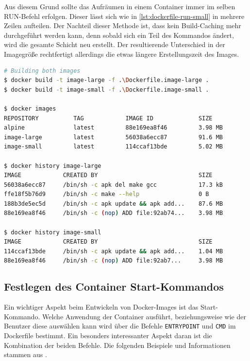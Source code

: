 Aus diesem Grund sollte das Aufräumen in einem Container immer im selben RUN-Befehl erfolgen.
Dieser lässt sich wie in \cref{lst:dockerfile-run-small} in mehrere Zeilen aufteilen.
Der Nachteil dieser Methode ist, dass kein Build-Caching mehr durchgeführt werden kann, denn sobald sich ein Teil des Kommandos ändert, wird die gesamte Schicht neu erstellt.
Der resultierende Unterschied in der Imagegröße rechtfertigt allerdings die etwas längere Erstellungszeit des Images.



\begin{lstlisting}[caption=Vergleich der Imagegröße nach Optimierung des RUN-Befehls, language=bash, label=lst:dockerfile-run-imagesize]
# Building both images
$ docker build -t image-large -f .\Dockerfile.image-large .
$ docker build -t image-small -f .\Dockerfile.image-small .

$ docker images
REPOSITORY          TAG            IMAGE ID             SIZE
alpine              latest         88e169ea8f46         3.98 MB
image-large         latest         56038a6ecc87         91.6 MB
image-small         latest         114ccaf13bde         5.02 MB

$ docker history image-large
IMAGE            CREATED BY                             SIZE
56038a6ecc87     /bin/sh -c apk del make gcc            17.3 kB
ffe18f5b76d9     /bin/sh -c make --help                 0 B
188b3de5ec5d     /bin/sh -c apk update && apk add...    87.6 MB
88e169ea8f46     /bin/sh -c (nop) ADD file:92ab74...    3.98 MB

$ docker history image-small
IMAGE            CREATED BY                             SIZE
114ccaf13bde     /bin/sh -c apk update && apk add...    1.04 MB
88e169ea8f46     /bin/sh -c (nop) ADD file:92ab7...     3.98 MB
\end{lstlisting}

\subsection{Festlegen des Container Start-Kommandos}
\label{sec:container-startup-command}
Ein wichtiger Aspekt beim Entwickeln von Docker-Images ist das Start-Kommando.
Welche Anwendung der Container ausführt, beziehungsweise wie der Benutzer diese auswählen kann wird über die Befehle \texttt{ENTRYPOINT} und \texttt{CMD} im Dockerfile bestimmt.
Ein besonders interessanter Aspekt daran ist die Kombination der beiden Befehle.
Die folgenden Beispiele und Informationen stammen aus \autocite{dockerfile-cmd-vs-entrypoint:online}.

